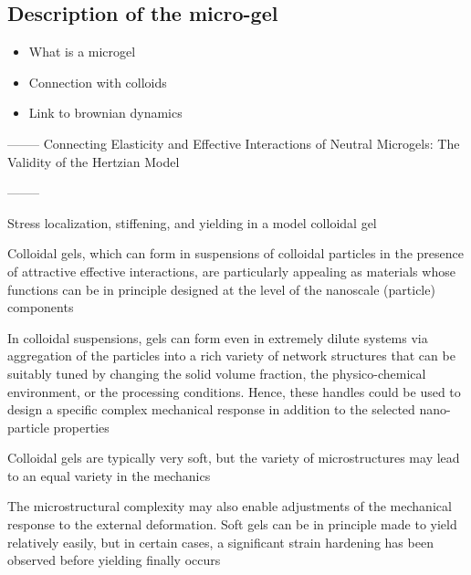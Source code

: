 \documentclass[../../main-notes.tex]{subfiles}
\begin{document}
\subsection{Description of the micro-gel}

\begin{itemize}
    \item What is a microgel
    \item Connection with colloids 
    \item Link to brownian dynamics
\end{itemize}

--------
Connecting Elasticity and Effective Interactions of Neutral Microgels: The Validity of the Hertzian Model\citep{rovigattiConnectingElasticityEffective2019}



--------

Stress localization, stiffening, and yielding in a model colloidal gel\citep{colomboStressLocalizationStiffening2014}

Colloidal gels, which can form in suspensions of colloidal particles in the presence of attractive effective interactions, are particularly appealing as materials whose functions can be in principle designed at the level of the nanoscale (particle) components

In colloidal suspensions, gels can form even in extremely dilute systems via aggregation of the particles into a rich variety of network structures that can be suitably tuned by changing the solid volume fraction, the physico-chemical environment, or the processing conditions. Hence, these handles could be used to design a specific complex mechanical response in addition to the selected nano-particle properties

Colloidal gels are typically very soft, but the variety of microstructures may lead to an equal variety in the mechanics

The microstructural complexity may also enable adjustments of the mechanical response to the external deformation. Soft gels can be in principle made to yield relatively easily, but in certain cases, a significant strain hardening has been observed before yielding finally occurs
\end{document}
